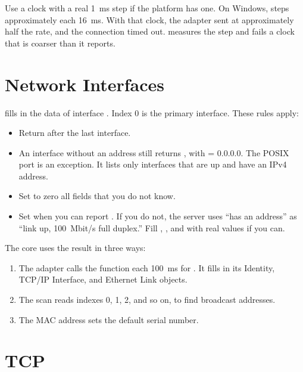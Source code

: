 \begin{caution}
Use a clock with a real 1~ms step if the platform has one. On Windows,
 steps approximately each 16~ms. With that clock, the
adapter sent \TO{} at approximately half the rate, and the connection timed
out.  measures the step and fails a clock that is
coarser than it reports.
\end{caution}

\section{Network Interfaces}

 fills in the data of interface
. Index 0 is the primary interface. These rules apply:

\begin{itemize}
  \item Return  after the last interface.
  \item An interface without an address still returns , with
         = 0.0.0.0. The POSIX port is an exception. It lists only
        interfaces that are up and have an IPv4 address.
  \item Set to zero all fields that you do not know.
  \item Set  when you can report . If you
        do not, the server uses ``has an address'' as ``link up, 100~Mbit/s
        full duplex.'' Fill , , and
         with real values if you can.
\end{itemize}

The core uses the result in three ways:

\begin{enumerate}
  \item The adapter calls the function each 100~ms for . It
        fills in its Identity, TCP/IP Interface, and Ethernet Link objects.
  \item The scan reads indexes 0, 1, 2, and so on, to find broadcast addresses.
  \item The MAC address sets the default serial number.
\end{enumerate}

\section{TCP}

